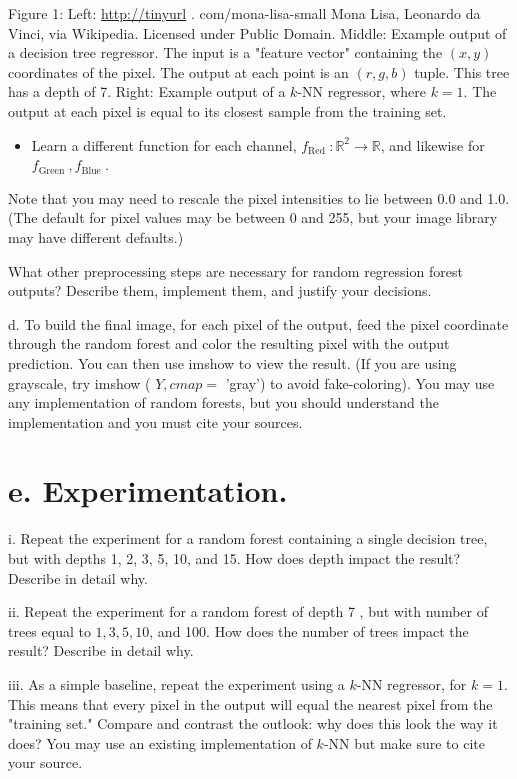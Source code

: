 \documentclass[10pt]{article}
\begin{document}
Figure 1: Left: \href{http://tinyurl}{http://tinyurl} . com/mona-lisa-small Mona Lisa, Leonardo da Vinci, via Wikipedia. Licensed under Public Domain. Middle: Example output of a decision tree regressor. The input is a "feature vector" containing the $(x, y)$ coordinates of the pixel. The output at each point is an $(r, g, b)$ tuple. This tree has a depth of 7. Right: Example output of a $k$-NN regressor, where $k=1$. The output at each pixel is equal to its closest sample from the training set.

\begin{itemize}
  \item Learn a different function for each channel, $f_{\text {Red }}: \mathbb{R}^{2} \rightarrow \mathbb{R}$, and likewise for $f_{\text {Green }}, f_{\text {Blue }}$.
\end{itemize}

Note that you may need to rescale the pixel intensities to lie between 0.0 and 1.0. (The default for pixel values may be between 0 and 255, but your image library may have different defaults.)

What other preprocessing steps are necessary for random regression forest outputs? Describe them, implement them, and justify your decisions.

d. To build the final image, for each pixel of the output, feed the pixel coordinate through the random forest and color the resulting pixel with the output prediction. You can then use imshow to view the result. (If you are using grayscale, try imshow ( $Y, c m a p=$ 'gray') to avoid fake-coloring). You may use any implementation of random forests, but you should understand the implementation and you must cite your sources.

\section*{e. Experimentation.}
i. Repeat the experiment for a random forest containing a single decision tree, but with depths 1, 2, 3, 5, 10, and 15. How does depth impact the result? Describe in detail why.

ii. Repeat the experiment for a random forest of depth 7 , but with number of trees equal to $1,3,5,10$, and 100. How does the number of trees impact the result? Describe in detail why.

iii. As a simple baseline, repeat the experiment using a $k$-NN regressor, for $k=1$. This means that every pixel in the output will equal the nearest pixel from the "training set." Compare and contrast the outlook: why does this look the way it does? You may use an existing implementation of $k$-NN but make sure to cite your source.
\end{document}

